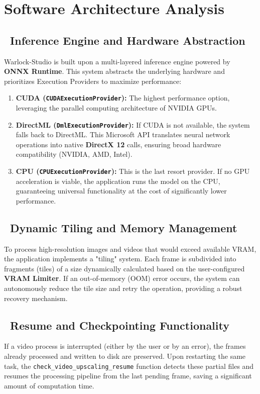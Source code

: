 \documentclass[11pt, a4paper]{article}
\newcommand{\SectionColor}{WarlockGray} %
\newcommand{\setsectioncolor}[1]{\renewcommand{\SectionColor}{#1}}
\newcommand{\inlinecode}[1]{\colorbox{WarlockLightGray}{\small\texttt{#1}}}
\begin{document}
\setsectioncolor{ArchColor}
\section{Software Architecture Analysis}

\subsection{\faCogs\ Inference Engine and Hardware Abstraction}
Warlock-Studio is built upon a multi-layered inference engine powered by \textbf{ONNX Runtime}. This system abstracts the underlying hardware and prioritizes Execution Providers to maximize performance:
\begin{enumerate}[leftmargin=*]
    \item \textbf{CUDA (\texttt{CUDAExecutionProvider}):} The highest performance option, leveraging the parallel computing architecture of NVIDIA GPUs.
    \item \textbf{DirectML (\texttt{DmlExecutionProvider}):} If CUDA is not available, the system falls back to DirectML. This Microsoft API translates neural network operations into native \textbf{DirectX 12} calls, ensuring broad hardware compatibility (NVIDIA, AMD, Intel).
    \item \textbf{CPU (\texttt{CPUExecutionProvider}):} This is the last resort provider. If no GPU acceleration is viable, the application runs the model on the CPU, guaranteeing universal functionality at the cost of significantly lower performance.
\end{enumerate}

\subsection{\faThLarge\ Dynamic Tiling and Memory Management}
To process high-resolution images and videos that would exceed available VRAM, the application implements a "tiling" system. Each frame is subdivided into fragments (tiles) of a size dynamically calculated based on the user-configured \textbf{VRAM Limiter}. If an out-of-memory (OOM) error occurs, the system can autonomously reduce the tile size and retry the operation, providing a robust recovery mechanism.

\subsection{\faSyncAlt\ Resume and Checkpointing Functionality}
If a video process is interrupted (either by the user or by an error), the frames already processed and written to disk are preserved. Upon restarting the same task, the \inlinecode{check\_video\_upscaling\_resume} function detects these partial files and resumes the processing pipeline from the last pending frame, saving a significant amount of computation time.
\end{document}
